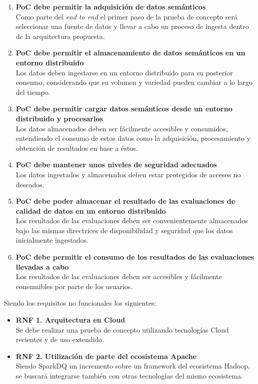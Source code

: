 \begin{enumerate}
\item \textbf{PoC debe permitir la adquisición de datos semánticos}\\Como parte
  del \textit{end to end} el primer paso de la prueba de concepto será
  seleccionar una fuente de datos y llevar a cabo un proceso de ingesta dentro
  de la arquitectura propuesta. 
  
\item \textbf{PoC debe permitir el almacenamiento de datos semánticos en un
  entorno distribuido}\\Los datos deben ingestarse en un entorno distribuido
  para su posterior consumo, considerando que su volumen y variedad pueden
  cambiar a lo largo del tiempo. 
\item \textbf{PoC debe permitir cargar datos semánticos desde un entorno
  distribuido y procesarlos}\\Los datos almacenados deben ser fácilmente
  accesibles y consumidos, entendiendo el consumo de estos datos como la
  adquisición, procesamiento y obtención de resultados en base a éstos. 
\item \textbf{PoC debe mantener unos niveles de seguridad adecuados}\\Los datos
  ingestados y almacenados deben estar protegidos de accesos no deseados. 
\item \textbf{PoC debe poder almacenar el resultado de las evaluaciones de
  calidad de datos en un entorno distribuido}\\Los resultados de las
  evaluaciones deben ser convenientemente almacenados bajo las mismas
  directrices de disponibilidad y seguridad que los datos inicialmente ingestados.
\item \textbf{PoC debe permitir el consumo de los resultados de las evaluaciones
  llevadas a cabo}\\Los resultados de las evaluaciones deben ser accesibles y
  fácilmente consumibles por parte de los usuarios. 
\end{enumerate}

Siendo los requisitos no funcionales los siguientes:

\begin{itemize}
\item \textbf{RNF 1. Arquitectura en Cloud}\\Se debe realizar una prueba de
  concepto utilizando tecnologías Cloud recientes y de uso extendido. 

\item \textbf{RNF 2. Utilización de parte del ecosistema Apache}\\Siendo SparkDQ
  un incremento sobre un framework del ecosistema Hadoop, se buscará integrarse
  también con otras tecnologías del mismo ecosistema. 
\end{itemize}



